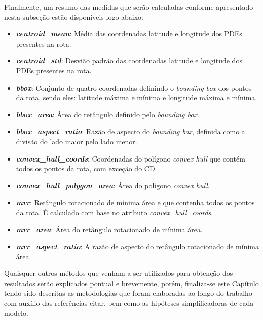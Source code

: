 Finalmente, um resumo das medidas que serão calculadas conforme apresentado nesta subseção estão disponíveis logo abaixo:
\begin{itemize}
    \item \textbf{\textit{centroid\_mean}}: Média das coordenadas latitude e longitude dos PDEs presentes na rota.
    \item \textbf{\textit{centroid\_std}}: Desvião padrão das coordenadas latitude e longitude dos PDEs presentes na rota. 
    \item \textbf{\textit{bbox}}: Conjunto de quatro coordenadas definindo o \textit{bounding box} dos pontos da rota, sendo eles: latitude máxima e mínima e longitude máxima e mínima. 
    \item \textbf{\textit{bbox\_area}}: Área do retângulo definido pelo \textit{bounding box}.
    \item \textbf{\textit{bbox\_aspect\_ratio}}: Razão de aspecto do \textit{bounding box}, definida como a divisão do lado maior pelo lado menor.
    \item \textbf{\textit{convex\_hull\_coords}}: Coordenadas do polígono \textit{convex hull} que contém todos os pontos da rota, com exceção do CD.
    \item \textbf{\textit{convex\_hull\_polygon\_area}}: Área do polígono \textit{convex hull}.
    \item \textbf{\textit{mrr}}: Retângulo rotacionado de mínima área e que contenha todos os pontos da rota. É calculado com base no atributo \textit{convex\_hull\_coords}. 
    \item \textbf{\textit{mrr\_area}}: Área do retângulo rotacionado de mínima área.
    \item \textbf{\textit{mrr\_aspect\_ratio}}: A razão de aspecto do retângulo rotacionado de mínima área.
\end{itemize}

Quaisquer outros métodos que venham a ser utilizados para obtenção dos resultados serão explicados pontual e brevemente, porém, finaliza-se este Capítulo tendo sido descritas as metodologias que foram elaboradas ao longo do trabalho com auxílio das referências citar, bem como as hipóteses simplificadoras de cada modelo. 
